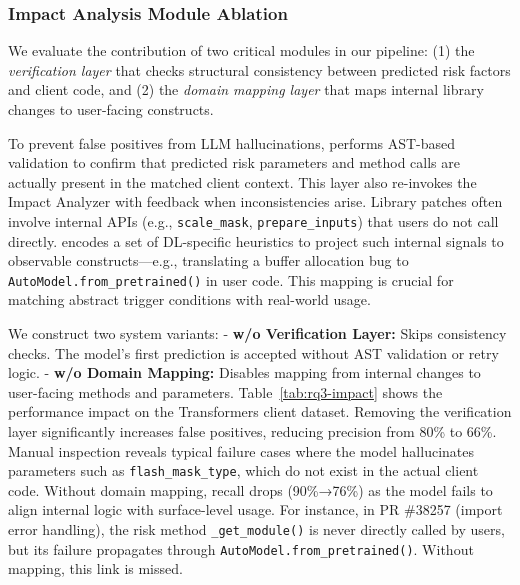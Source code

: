 \subsubsection{Impact Analysis Module Ablation}
We evaluate the contribution of two critical modules in our pipeline: (1) the \textit{verification layer} that checks structural consistency between predicted risk factors and client code, and (2) the \textit{domain mapping layer} that maps internal library changes to user-facing constructs.

To prevent false positives from LLM hallucinations, \appname performs AST-based validation to confirm that predicted risk parameters and method calls are actually present in the matched client context. 
This layer also re-invokes the Impact Analyzer with feedback when inconsistencies arise.
Library patches often involve internal APIs (e.g., \texttt{scale\_mask}, \texttt{prepare\_inputs}) that users do not call directly. 
\appname encodes a set of DL-specific heuristics to project such internal signals to observable constructs—e.g., translating a buffer allocation bug to \texttt{AutoModel.from\_pretrained()} in user code. 
This mapping is crucial for matching abstract trigger conditions with real-world usage.

We construct two system variants:
- \textbf{w/o Verification Layer:} Skips consistency checks. The model’s first prediction is accepted without AST validation or retry logic.
- \textbf{w/o Domain Mapping:} Disables mapping from internal changes to user-facing methods and parameters.
Table~\ref{tab:rq3-impact} shows the performance impact on the Transformers client dataset.
Removing the verification layer significantly increases false positives, reducing precision from 80\% to 66\%.
Manual inspection reveals typical failure cases where the model hallucinates parameters such as \texttt{flash\_mask\_type}, which do not exist in the actual client code.
Without domain mapping, recall drops (90\%→76\%) as the model fails to align internal logic with surface-level usage.
For instance, in PR \#38257 (import error handling), the risk method \texttt{\_get\_module()} is never directly called by users, but its failure propagates through \texttt{AutoModel.from\_pretrained()}. Without mapping, this link is missed.

